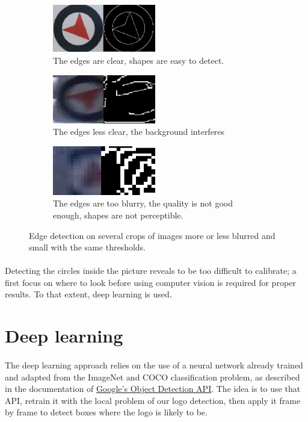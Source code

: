 \documentclass[12pt]{article}%
\begin{document}
\captionsetup[subfigure]{labelformat=simple, labelsep=period}
\begin{figure}
	\centering
	\begin{subfigure}[t]{5cm}
		\centering
		\includegraphics[width=4.5cm]{images/edgeDetect1.png}
		\caption{The edges are clear, shapes are easy to detect.}
	\end{subfigure}
	\begin{subfigure}[t]{5cm}
		\centering
		\includegraphics[width=4.5cm]{images/edgeDetect2.png}
		\caption{The edges less clear, the background interferes}
	\end{subfigure}
	\begin{subfigure}[t]{5cm}
		\centering
		\includegraphics[width=4.5cm]{images/edgeDetect3.png}
		\caption{The edges are too blurry, the quality is not good enough, shapes are not perceptible.}
	\end{subfigure}
	\caption{Edge detection on several crops of images more or less blurred and small with the same thresholds.}\label{fig:edgeDetection}
\end{figure}

\paragraph{}
Detecting the circles inside the picture reveals to be too difficult to calibrate; a first focus on where to look before using computer vision is required for proper results. To that extent, deep learning is used.

\section{Deep learning}

\paragraph{}
The deep learning approach relies on the use of a neural network already trained and adapted from the ImageNet and COCO classification problem, as described in the documentation of \href{https://github.com/tensorflow/models/tree/master/research/object_detection}{Google's Object Detection API}.
The idea is to use that API, retrain it with the local problem of our logo detection, then apply it frame by frame to detect boxes where the logo is likely to be.
\end{document}
